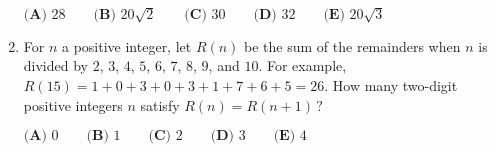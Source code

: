 \documentclass{article}
\begin{document}
\begin{enumerate}[label=\arabic*., itemsep=0.5em]
\(\textbf{(A) } 28 \qquad \textbf{(B) } 20\sqrt{2} \qquad \textbf{(C) } 30 \qquad \textbf{(D) } 32 \qquad \textbf{(E) } 20\sqrt{3}\)\par \vspace{0.5em}\item For \(n\) a positive integer, let \(R(n)\) be the sum of the remainders when \(n\) is divided by \(2\), \(3\), \(4\), \(5\), \(6\), \(7\), \(8\), \(9\), and \(10\). For example, \(R(15) = 1+0+3+0+3+1+7+6+5=26\). How many two-digit positive integers \(n\) satisfy \(R(n) = R(n+1)\,?\)

\(\textbf{(A) }0\qquad\textbf{(B) }1\qquad\textbf{(C) }2\qquad\textbf{(D) }3\qquad\textbf{(E) }4\)\par \vspace{0.5em}\end{enumerate}
\end{document}
